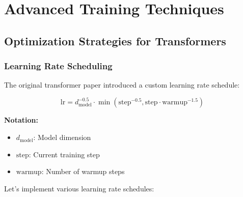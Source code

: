\documentclass[11pt]{article}
\begin{document}
\section{Advanced Training Techniques}

\subsection{Optimization Strategies for Transformers}

\subsubsection{Learning Rate Scheduling}

The original transformer paper introduced a custom learning rate schedule:

\begin{equation}
\text{lr} = d_{\text{model}}^{-0.5} \cdot \min(\text{step}^{-0.5}, \text{step} \cdot \text{warmup}^{-1.5})
\end{equation}

\begin{notationbox}
\textbf{Notation:}
\begin{itemize}
    \item $d_{\text{model}}$: Model dimension
    \item $\text{step}$: Current training step
    \item $\text{warmup}$: Number of warmup steps
\end{itemize}
\end{notationbox}

Let's implement various learning rate schedules:
\end{document}
